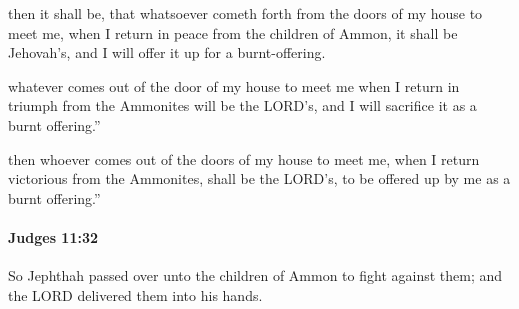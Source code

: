 			\begin{versebox}
					\item[BHS] 
					\item[ASV] then it shall be, that whatsoever cometh forth from the doors of my house to meet me, when I return in peace from the children of Ammon, it shall be Jehovah's, and I will offer it up for a burnt-offering.
					\item[NIV] whatever comes out of the door of my house to meet me when I return in triumph from the Ammonites will be the LORD’s, and I will sacrifice it as a burnt offering.”
					\item[NRSV] then whoever comes out of the doors of my house to meet me, when I return victorious from the Ammonites, shall be the LORD’s, to be offered up by me as a burnt offering.”
			\end{versebox}

		\paragraph{Judges 11:32} %
			\label{JUDGES-11-32}

			So Jephthah passed over unto the children of Ammon to fight against them; and the LORD delivered them into his hands.

